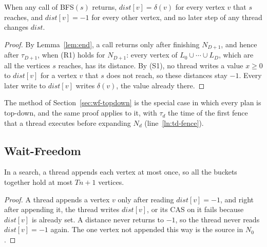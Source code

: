 \begin{theorem}[Correctness]
\label{thm:correct}
When any call of \textsc{BFS}$(s)$ returns, $\mathit{dist}[v] = \delta(v)$ for every vertex $v$ that $s$ reaches, and $\mathit{dist}[v] = -1$ for every other vertex, and no later step of any thread changes $\mathit{dist}$.
\end{theorem}
\begin{proof}
By Lemma~\ref{lem:end}, a call returns only after finishing $N_{D+1}$, and hence after $\tau_{D+1}$, when (R1) holds for $N_{D+1}$: every vertex of $L_0 \cup \cdots \cup L_D$, which are all the vertices $s$ reaches, has its distance. By (S1), no thread writes a value $x \geq 0$ to $\mathit{dist}[v]$ for a vertex $v$ that $s$ does not reach, so these distances stay $-1$. Every later write to $\mathit{dist}[v]$ writes $\delta(v)$, the value already there.
\end{proof}

The method of Section~\ref{sec:wf-topdown} is the special case in which every plan is top-down, and the same proof applies to it, with $\tau_d$ the time of the first fence that a thread executes before expanding $N_d$ (line~\ref{ln:td-fence}).

\subsection{Wait-Freedom}
\label{sec:pf-waitfree}

\begin{lemma}[Appends]
\label{lem:once}
In a search, a thread appends each vertex at most once, so all the buckets together hold at most $Tn + 1$ vertices.
\end{lemma}
\begin{proof}
A thread appends a vertex $v$ only after reading $\mathit{dist}[v] = -1$, and right after appending it, the thread writes $\mathit{dist}[v]$, or its CAS on it fails because $\mathit{dist}[v]$ is already set. A distance never returns to $-1$, so the thread never reads $\mathit{dist}[v] = -1$ again. The one vertex not appended this way is the source in $N_0$.
\end{proof}

